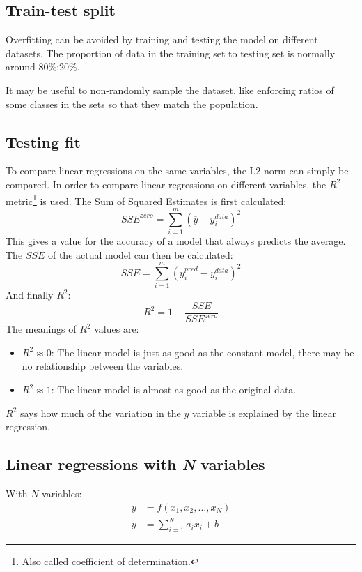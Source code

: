 \subsection{Train-test split}
Overfitting can be avoided by training and testing the model on different datasets. The proportion of data in the training set to testing set is normally around 80\%:20\%.

It may be useful to non-randomly sample the dataset, like enforcing ratios of some classes in the sets so that they match the population.

\subsection{Testing fit}
To compare linear regressions on the same variables, the L2 norm can simply be compared. In order to compare linear regressions on different variables, the \(R^2\) metric\footnote{Also called coefficient of determination.} is used. The Sum of Squared Estimates is first calculated:
\begin{equation*}
    SSE^{zero} = \sum_{i=1}^{m}(\overline{y} - y_i^{data})^2
\end{equation*}
This gives a value for the accuracy of a model that always predicts the average. The \(SSE\) of the actual model can then be calculated:
\begin{equation*}
    SSE = \sum_{i=1}^{m}(y_i^{pred} - y_i^{data})^2
\end{equation*}
And finally \(R^2\):
\begin{equation}
    R^2 = 1 - \frac{SSE}{SSE^{zero}}
    \label{eq:r_squared}
\end{equation}
The meanings of \(R^2\) values are:
\begin{itemize}
    \item \(R^2 \approx 0\): The linear model is just as good as the constant model, there may be no relationship between the variables.
    \item \(R^2 \approx 1\): The linear model is almost as good as the original data.
\end{itemize}
\(R^2\) says how much of the variation in the \(y\) variable is explained by the linear regression.

\subsection{Linear regressions with \emph{N} variables}
With \(N\) variables:
\begin{align*}
    y & = f(x_1, x_2, \dots, x_N)  \\
    y & = \sum_{i=1}^{N}a_ix_i + b
\end{align*}
